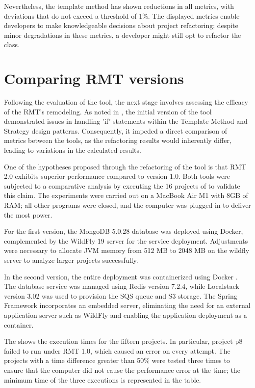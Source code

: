 Nevertheless, the template method has shown reductions in all metrics, with deviations that do not exceed a threshold of 1\%. The displayed metrics enable developers to make knowledgeable decisions about project refactoring; despite minor degradations in these metrics, a developer might still opt to refactor the class.



\section{Comparing RMT versions}
\label{sec-comparing}

Following the evaluation of the tool, the next stage involves assessing the efficacy of the RMT's remodeling. As noted in , the initial version of the tool demonstrated issues in handling 'if' statements within the Template Method and Strategy design patterns. Consequently, it impeded a direct comparison of metrics between the tools, as the refactoring results would inherently differ, leading to variations in the calculated results.

One of the hypotheses proposed through the refactoring of the tool is that RMT 2.0 exhibits superior performance compared to version 1.0. Both tools were subjected to a comparative analysis by executing the 16 projects of  to validate this claim. The experiments were carried out on a MacBook Air M1 with 8GB of RAM; all other programs were closed, and the computer was plugged in to deliver the most power.

For the first version, the MongoDB 5.0.28 \cite{mongo} database was deployed using Docker, complemented by the WildFly 19 \cite{wildfly} server for the service deployment. Adjustments were necessary to allocate JVM memory from 512 MB to 2048 MB on the wildfly server to analyze larger projects successfully.

In the second version, the entire deployment was containerized using Docker \cite{docker}. The database service was managed using Redis \cite{Redis} version 7.2.4, while Localstack \cite{localstack} version 3.02 was used to provision the SQS queue and S3 storage. The Spring Framework \cite{spring} incorporates an embedded server, eliminating the need for an external application server such as WildFly and enabling the application deployment as a container.

The  shows the execution times for the fifteen projects. In particular, project p8 failed to run under RMT 1.0, which caused an error on every attempt. The projects with a time difference greater than 50\% were tested three times to ensure that the computer did not cause the performance error at the time; the minimum time of the three executions is represented in the table. 

